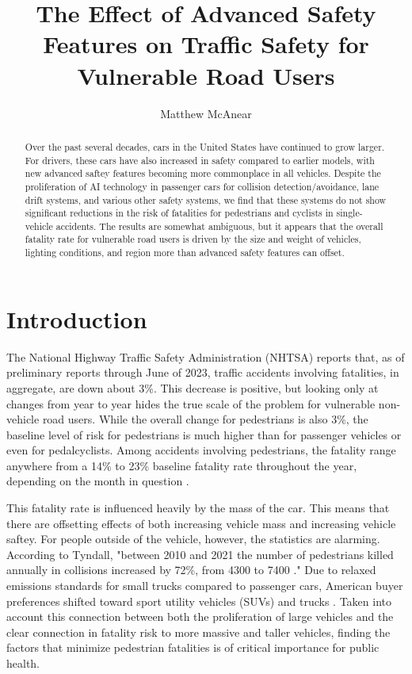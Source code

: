 \documentclass[12pt]{article}
\author{Matthew McAnear}
\title{The Effect of Advanced Safety Features on Traffic Safety for Vulnerable Road Users}
\begin{document}
\maketitle

\begin{abstract}
    Over the past several decades, cars in the United States have continued to grow larger. For drivers, these cars
    have also increased in safety compared to earlier models, with new advanced saftey features becoming more 
    commonplace in all vehicles. Despite the proliferation of AI technology in passenger cars for collision 
    detection/avoidance, lane drift systems, and various other safety systems, we find that these systems do not 
    show significant reductions in the risk of fatalities for pedestrians and cyclists in single-vehicle accidents. The 
    results are somewhat ambiguous, but it appears that the overall fatality rate for vulnerable road users is driven
    by the size and weight of vehicles, lighting conditions, and region more than advanced safety features can offset.
\end{abstract}


\section{Introduction}

The National Highway Traffic Safety Administration (NHTSA) reports that, as of preliminary reports through
June of 2023, traffic accidents involving fatalities, in aggregate, are down about 3\%. This decrease is positive,
but looking only at changes from year to year hides the true scale of the problem for vulnerable non-vehicle
road users. While the overall change for pedestrians is also 3\%, the baseline level of risk for pedestrians is
much higher than for passenger vehicles or even for pedalcyclists. Among accidents involving pedestrians, the fatality
range anywhere from a 14\% to 23\% baseline fatality rate throughout the year, depending on the month in
question \cite{national_highway_traffic_safety_administration_early_2024}.

This fatality rate is influenced heavily by the mass of the car\cite{evans_car_1992}. This means that there
are offsetting effects of both increasing vehicle mass and increasing
vehicle saftey. For people outside of the vehicle, however, the statistics are alarming. According to Tyndall,
"between 2010 and 2021 the number of pedestrians killed annually in collisions increased by 72\%, from 4300 to
7400 \cite{tyndall_effect_2024}." Due to relaxed emissions standards for small trucks compared to passenger cars,
American buyer preferences shifted toward sport utility vehicles (SUVs) and trucks \cite{kovach_rise_2021}. Taken into
account this connection between both the proliferation of large vehicles and the clear connection in fatality risk to
more massive and taller vehicles\cite{tyndall_effect_2024}, finding the factors that minimize pedestrian fatalities
is of critical importance for public health.
\end{document}
